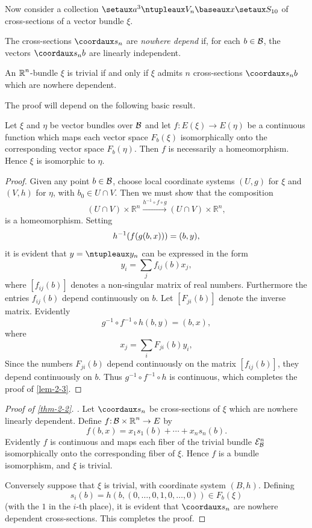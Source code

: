 Now consider a collection $\set{a^3}\ntuple{V_n}\base{x} \set{S_{10}}$ of cross-sections of a vector
bundle $\xi$.

\begin{definition}\label{def:2-4}
	 The cross-sections $\coord{s_n}$ are \textit{nowhere depend}
	if, for each $b \in \mathcal{B}$, the vectors $\coord{s_nb}$ are linearly independent.
\end{definition}
\begin{theorem}\label{thm-2-2}
	An $\boldsymbol{\mathbb{R}}^n$-bundle $\xi$ is trivial if and only if $\xi$ admits $n$ cross-sections $\coord{s_nb}$ which are nowhere dependent.
\end{theorem}

The proof will depend on the following basic result.
\begin{lemma}\label{lem-2-3}
	Let $\xi$ and $\eta$ be vector bundles over $\mathcal{B}$ and let
	$f\mathpunct{:} E(\xi) \rightarrow E(\eta)$ be a continuous function which maps each vector space $F_{b}(\xi)$ isomorphically onto the corresponding vector space $F_{b}(\eta)$. Then $f$ is necessarily a homeomorphism. Hence
	$\xi$ is isomorphic to $\eta$.
\end{lemma}
\begin{proof}
	Given any point $b \in \mathcal{B}$, choose local coordinate systems
	$(U,g)$ for $\xi$ and $(V,h)$ for $\eta$, with $b_{0} \in U \cap V$. Then we must show
	that the composition
	\[(U \cap V) \times \mathbb{R}^{n} \xrightarrow{h^{-1} \circ f \circ g}(U \cap V) \times \mathbb{R}^{n},\]
	is a homeomorphism. Setting
	\[h^{-1}(f(g(b, x)))=(b, y),\]
	it is evident that $y =\ntuple{y_n}$ can be expressed in the form
	\[y_{i}=\sum_{j} f_{i j}(b) x_{j},\]
	where $[f_{i j}(b)]$ denotes a non-singular matrix of real numbers. 
	Furthermore the entries $f_{i j}(b)$ depend continuously on $b$. Let $[F_{ji}(b)]$ denote
	the inverse matrix. Evidently
	\[g^{-1} \circ f^{-1} \circ h(b, y)=(b, x), \]
	where
	\[x_{j}=\sum_{i} F_{ji}(b) y_{i},\]
	Since the numbers $F_{ji}(b)$ depend continuously on the matrix $[f_{i j}(b)]$,
	they depend continuously on $b$. Thus $g^{-1} \circ f^{-1} \circ h$ is continuous, which
	completes the proof of \cref{lem-2-3}.
\end{proof}
\begin{proof}[Proof of \cref{thm-2-2}. ]
	Let $\coord{s_n}$ be cross-sections of $\xi$ which
	are nowhere linearly dependent. Define
$f\mathpunct{:} \mathcal{B} \times \boldsymbol{\mathbb{R}}^{n} \rightarrow E$ by
			\[f(b, x)=x_{1} s_{1}(b)+\cdots+x_{n} s_{n}(b).\]
 Evidently $f$ is continuous and maps each fiber of the trivial bundle $\mathcal{E}^n_{\mathcal{B}}$
 isomorphically onto the corresponding fiber of $\xi$. Hence $f$ is a bundle
 isomorphism, and $\xi$ is trivial.
 
 Conversely suppose that $\xi$ is trivial, with coordinate system $(B, h)$. Defining
 \[s_{i}(b)=h(b,(0, \dots, 0,1,0, \dots, 0)) \in F_{b}(\xi)\]
 (with the $1$ in the $i$-th place), it is evident that $\coord{s_n}$ are nowhere
 dependent cross-sections. This completes the proof.
\end{proof}

